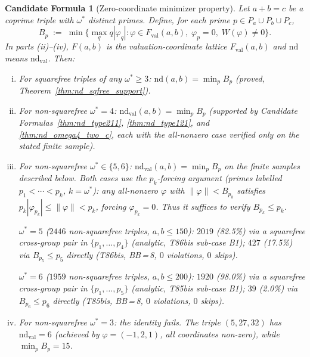 \documentclass[12pt]{article}
\newtheorem{candidate}{Candidate Formula}
\theoremstyle{definition}
\begin{document}
\begin{candidate}[Zero-coordinate minimizer property]\label{thm:nd_zero_coord}
  Let $a+b=c$ be a coprime triple with $\omega^*$ distinct primes.  Define, for
  each prime $p \in P_a \cup P_b \cup P_c$,
  \[
    B_p \;:=\; \min\bigl\{
      \max_q q|\varphi_q| : \varphi \in F_{\mathrm{val}}(a,b),\; \varphi_p = 0,\;
      W(\varphi) \ne 0
    \bigr\}.
  \]
  In parts (ii)--(iv), $F(a,b)$ is the valuation-coordinate lattice
  $F_{\mathrm{val}}(a,b)$ and $\mathrm{nd}$ means $\mathrm{nd}_{\mathrm{val}}$.
  Then:
  \begin{enumerate}[(i)]
    \item For \emph{squarefree} triples of any $\omega^*\ge 3$:
      $\mathrm{nd}(a,b) = \min_{p} B_p$ (proved, Theorem~\ref{thm:nd_sqfree_support}).
    \item For \emph{non-squarefree} $\omega^* = 4$:
      $\mathrm{nd}_{\mathrm{val}}(a,b) = \min_{p} B_p$
      (supported by Candidate Formulas~\ref{thm:nd_type211},
      \ref{thm:nd_type121}, and \ref{thm:nd_omega4_two_c}, each with the
      all-nonzero case verified only on the stated finite sample).
    \item For \emph{non-squarefree} $\omega^* \in \{5, 6\}$:
      $\mathrm{nd}_{\mathrm{val}}(a,b) = \min_{p} B_p$ on the finite samples
      described below.
      Both cases use the $p_k$-forcing argument (primes labelled $p_1<\cdots<p_k$,
      $k=\omega^*$): any all-nonzero $\varphi$ with $\|\varphi\|<B_{p_k}$ satisfies
      $p_k|\varphi_{p_k}|\le\|\varphi\|<p_k$, forcing $\varphi_{p_k}=0$.
      Thus it suffices to verify $B_{p_k}\le p_k$.

      \textbf{$\omega^*=5$} ($2446$ non-squarefree triples, $a,b\le 150$):
      $2019$ (82.5\%) via a squarefree cross-group pair in $\{p_1,\ldots,p_4\}$
      (analytic, T86bis sub-case B1);
      $427$ (17.5\%) via $B_{p_5}\le p_5$ directly
      (T86bis, BB\,=\,8, $0$ violations, $0$ skips).

      \textbf{$\omega^*=6$} ($1959$ non-squarefree triples, $a,b\le 200$):
      $1920$ (98.0\%) via a squarefree cross-group pair in $\{p_1,\ldots,p_5\}$
      (analytic, T85bis sub-case B1);
      $39$ (2.0\%) via $B_{p_6}\le p_6$ directly
      (T85bis, BB\,=\,8, $0$ violations, $0$ skips).
    \item For \emph{non-squarefree} $\omega^* = 3$: the identity \emph{fails}.
      The triple $(5,27,32)$ has $\mathrm{nd}_{\mathrm{val}}=6$
      (achieved by $\varphi=(-1,2,1)$,
      all coordinates non-zero), while $\min_p B_p = 15$.
  \end{enumerate}
\end{candidate}
\end{document}
